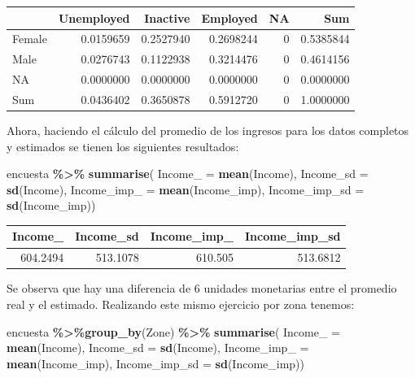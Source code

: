 \documentclass[
  spanish,
  12pt,
]{book}
\newenvironment{Shaded}{\begin{snugshade}}{\end{snugshade}}
\newcommand{\AttributeTok}[1]{\textcolor[rgb]{0.13,0.29,0.53}{#1}}
\newcommand{\FunctionTok}[1]{\textcolor[rgb]{0.13,0.29,0.53}{\textbf{#1}}}
\newcommand{\NormalTok}[1]{#1}
\newcommand{\SpecialCharTok}[1]{\textcolor[rgb]{0.81,0.36,0.00}{\textbf{#1}}}
\begin{document}
\begin{tabular}{l|r|r|r|r|r}
\hline
  & Unemployed & Inactive & Employed & NA & Sum\\
\hline
Female & 0.0159659 & 0.2527940 & 0.2698244 & 0 & 0.5385844\\
\hline
Male & 0.0276743 & 0.1122938 & 0.3214476 & 0 & 0.4614156\\
\hline
NA & 0.0000000 & 0.0000000 & 0.0000000 & 0 & 0.0000000\\
\hline
Sum & 0.0436402 & 0.3650878 & 0.5912720 & 0 & 1.0000000\\
\hline
\end{tabular}

Ahora, haciendo el cálculo del promedio de los ingresos para los datos completos y estimados se tienen los siguientes resultados:

\begin{Shaded}
\begin{Highlighting}[]
\NormalTok{encuesta }\SpecialCharTok{\%\textgreater{}\%} \FunctionTok{summarise}\NormalTok{(}
  \AttributeTok{Income\_ =} \FunctionTok{mean}\NormalTok{(Income),}
  \AttributeTok{Income\_sd =} \FunctionTok{sd}\NormalTok{(Income),}
  \AttributeTok{Income\_imp\_ =} \FunctionTok{mean}\NormalTok{(Income\_imp),}
  \AttributeTok{Income\_imp\_sd =} \FunctionTok{sd}\NormalTok{(Income\_imp))}
\end{Highlighting}
\end{Shaded}

\begin{tabular}{r|r|r|r}
\hline
Income\_ & Income\_sd & Income\_imp\_ & Income\_imp\_sd\\
\hline
604.2494 & 513.1078 & 610.505 & 513.6812\\
\hline
\end{tabular}

Se observa que hay una diferencia de 6 unidades monetarias entre el promedio real y el estimado. Realizando este mismo ejercicio por zona tenemos:

\begin{Shaded}
\begin{Highlighting}[]
\NormalTok{encuesta }\SpecialCharTok{\%\textgreater{}\%}\FunctionTok{group\_by}\NormalTok{(Zone) }\SpecialCharTok{\%\textgreater{}\%}  \FunctionTok{summarise}\NormalTok{(}
  \AttributeTok{Income\_ =} \FunctionTok{mean}\NormalTok{(Income),}
  \AttributeTok{Income\_sd =} \FunctionTok{sd}\NormalTok{(Income),}
  \AttributeTok{Income\_imp\_ =} \FunctionTok{mean}\NormalTok{(Income\_imp),}
  \AttributeTok{Income\_imp\_sd =} \FunctionTok{sd}\NormalTok{(Income\_imp))}
\end{Highlighting}
\end{Shaded}
\end{document}
